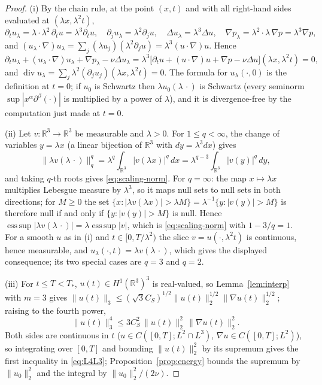\documentclass[11pt]{article}
\theoremstyle{definition}
\theoremstyle{plain}
\newcommand{\R}{\mathbb R}
\begin{document}
\begin{proof}
(i) By the chain rule, at the point $(x,t)$ and with all right-hand sides
evaluated at $(\lambda x,\lambda^2t)$,
\[
 \partial_tu_\lambda=\lambda\cdot\lambda^2\,\partial_tu=\lambda^3\partial_tu,\quad
 \partial_ju_\lambda=\lambda^2\partial_ju,\quad
 \Delta u_\lambda=\lambda^3\Delta u,\quad
 \nabla p_\lambda=\lambda^2\cdot\lambda\,\nabla p=\lambda^3\nabla p,
\]
and
$(u_\lambda\cdot\nabla)u_\lambda=\sum_j(\lambda u_j)(\lambda^2\partial_ju)
=\lambda^3(u\cdot\nabla)u$.  Hence
\[
 \partial_tu_\lambda+(u_\lambda\cdot\nabla)u_\lambda+\nabla p_\lambda-\nu\Delta u_\lambda
 =\lambda^3\bigl[\partial_tu+(u\cdot\nabla)u+\nabla p-\nu\Delta u\bigr](\lambda x,\lambda^2t)=0,
\]
and $\operatorname{div}u_\lambda=\sum_j\lambda^2(\partial_ju_j)(\lambda x,\lambda^2t)=0$.
The formula for $u_\lambda(\cdot,0)$ is the definition at $t=0$; if $u_0$ is
Schwartz then $\lambda u_0(\lambda\,\cdot)$ is Schwartz (every seminorm
$\sup|x^\alpha\partial^\beta(\cdot)|$ is multiplied by a power of
$\lambda$), and it is divergence-free by the computation just made at $t=0$.

(ii) Let $v\colon\R^3\to\R^3$ be measurable and $\lambda>0$.  For
$1\le q<\infty$, the change of variables $y=\lambda x$ (a linear
bijection of $\R^3$ with $dy=\lambda^3dx$) gives
\[
 \|\lambda v(\lambda\,\cdot)\|_q^q=\lambda^q\int_{\R^3}|v(\lambda x)|^q\,dx
 =\lambda^{q-3}\int_{\R^3}|v(y)|^q\,dy,
\]
and taking $q$-th roots gives \eqref{eq:scaling-norm}.  For $q=\infty$:
the map $x\mapsto\lambda x$ multiplies Lebesgue measure by $\lambda^3$, so
it maps null sets to null sets in both directions; for $M\ge0$ the set
$\{x:|\lambda v(\lambda x)|>\lambda M\}=\lambda^{-1}\{y:|v(y)|>M\}$ is
therefore null if and only if $\{y:|v(y)|>M\}$ is null.  Hence
$\operatorname*{ess\,sup}|\lambda v(\lambda\,\cdot)|
=\lambda\operatorname*{ess\,sup}|v|$, which is \eqref{eq:scaling-norm}
with $1-3/q=1$.  For a smooth $u$ as in (i) and $t\in[0,T/\lambda^2)$ the
slice $v=u(\cdot,\lambda^2t)$ is continuous, hence measurable, and
$u_\lambda(\cdot,t)=\lambda v(\lambda\,\cdot)$, which gives the displayed
consequence; its two special cases are $q=3$ and $q=2$.

(iii) For $t\le T<T_*$, $u(t)\in H^1(\R^3)^3$ is real-valued, so
Lemma~\ref{lem:interp} with $m=3$ gives
$\|u(t)\|_3\le(\sqrt3C_S)^{1/2}\|u(t)\|_2^{1/2}\|\nabla u(t)\|_2^{1/2}$;
raising to the fourth power,
\begin{equation}\label{eq:L4L3-constant}
 \|u(t)\|_3^4\le3C_S^2\,\|u(t)\|_2^2\,\|\nabla u(t)\|_2^2 .
\end{equation}
Both sides are continuous in $t$ ($u\in C([0,T];L^2\cap L^3)$,
$\nabla u\in C([0,T];L^2)$), so integrating over $[0,T]$ and bounding
$\|u(t)\|_2^2$ by its supremum gives the first inequality in
\eqref{eq:L4L3}; Proposition~\ref{prop:energy} bounds the supremum by
$\|u_0\|_2^2$ and the integral by $\|u_0\|_2^2/(2\nu)$.
\end{proof}
\end{document}

